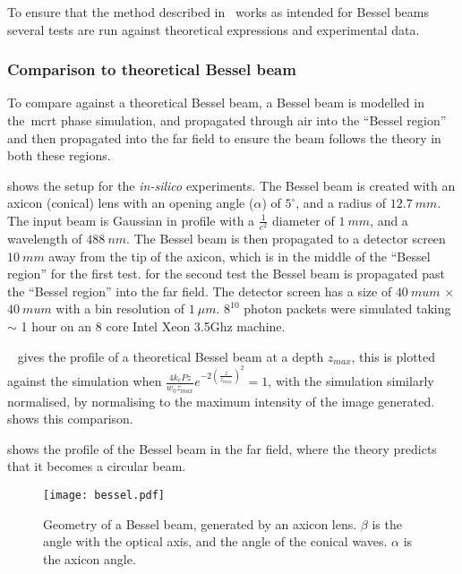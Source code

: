 To ensure that the method described in~ works as intended for Bessel beams several tests are run against theoretical expressions and experimental data.

\subsubsection*{Comparison to theoretical Bessel beam}

To compare against a theoretical Bessel beam, a Bessel beam is modelled in the~\gls*{mcrt} phase simulation, and propagated through air into the ``Bessel region'' and then propagated into the far field to ensure the beam follows the theory in both these regions.

 shows the setup for the \textit{in-silico} experiments.
The Bessel beam is created with an axicon (conical) lens with an opening angle ($\alpha$) of $5^{\circ}$, and a radius of $12.7~mm$.
The input beam is Gaussian in profile with a $\tfrac{1}{e^2}$ diameter of $1~mm$, and a wavelength of $488~nm$.
The Bessel beam is then propagated to a detector screen $10~mm$ away from the tip of the axicon, which is in the middle of the ``Bessel region'' for the first test.
for the second test the Bessel beam is propagated past the ``Bessel region'' into the far field.
The detector screen has a size of $40~mu m$ $\times$ $40~mu m$ with a bin resolution of $1~\mu m$.
$8^10$ photon packets were simulated taking $\sim$ 1 hour on an 8 core Intel Xeon 3.5Ghz machine.

\medskip

~ gives the profile of a theoretical Bessel beam at a depth $z_{max}$, this is plotted against the simulation when $\tfrac{4k_rPz}{w_0z_{max}}e^{-2\left(\tfrac{z}{z_{max}}\right)^2}=1$, with the simulation similarly normalised, by normalising to the maximum intensity of the image generated. ~ shows this comparison.

 shows the profile of the Bessel beam in the far field, where the theory predicts that it becomes a circular beam.

\begin{figure}[!ht]
    \centering
    \texttt{[image: bessel.pdf]}
    \caption{Geometry of a Bessel beam, generated by an axicon lens. $\beta$ is the angle with the optical axis, and the angle of the conical waves. $\alpha$ is the axicon angle.}
    \label{fig:besselgeo}
\end{figure}




